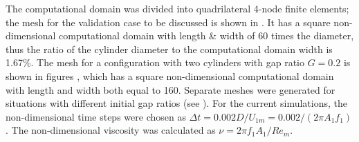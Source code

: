 The computational domain was divided into quadrilateral 4-node finite elements; the mesh for the validation case to be discussed is shown in . It has a square non-dimensional computational domain with length \& width of 60 times the diameter, thus the ratio of the cylinder diameter to the computational domain width is 1.67\%. The mesh for a configuration with two cylinders with gap ratio $ G=0.2 $ is shown in figures , which has a square non-dimensional computational domain with length and width both equal to 160. Separate meshes were generated for situations with different initial gap ratios (see ). For the current simulations, the non-dimensional time steps were chosen as $ \Delta t = 0.002D/U_{1m}= 0.002/(2\pi A_1 f_1) $. The non-dimensional viscosity was calculated as $ \nu =2\pi f_1 A_1/Re_m $. 

